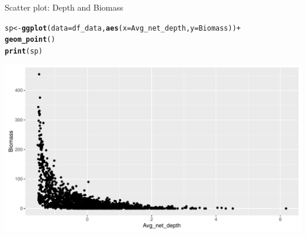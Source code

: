\documentclass{beamer}\usepackage[]{graphicx}\usepackage[]{color}
\makeatletter
\newcommand{\hlopt}[1]{\textcolor[rgb]{0,0,0}{#1}}%
\newcommand{\hlstd}[1]{\textcolor[rgb]{0.345,0.345,0.345}{#1}}%
\newcommand{\hlkwb}[1]{\textcolor[rgb]{0.69,0.353,0.396}{#1}}%
\newcommand{\hlkwc}[1]{\textcolor[rgb]{0.333,0.667,0.333}{#1}}%
\newcommand{\hlkwd}[1]{\textcolor[rgb]{0.737,0.353,0.396}{\textbf{#1}}}%
\newenvironment{kframe}{%
 \def\at@end@of@kframe{}%
 \ifinner\ifhmode%
  \def\at@end@of@kframe{\end{minipage}}%
  \begin{minipage}{\columnwidth}%
 \fi\fi%
 \def\FrameCommand##1{\hskip\@totalleftmargin \hskip-\fboxsep
 \colorbox{shadecolor}{##1}\hskip-\fboxsep
     \hskip-\linewidth \hskip-\@totalleftmargin \hskip\columnwidth}%
 \MakeFramed {\advance\hsize-\width
   \@totalleftmargin\z@ \linewidth\hsize
   \@setminipage}}%
 {\par\unskip\endMakeFramed%
 \at@end@of@kframe}
\newenvironment{knitrout}{}{} %
\makeatother
\begin{document}
\begin{frame}[fragile]{Scatter plot: Depth and Biomass}
\begin{knitrout}\footnotesize
{}\color{fgcolor}\begin{kframe}
\begin{alltt}
\hlstd{sp} \hlkwb{<-} \hlkwd{ggplot}\hlstd{(}\hlkwc{data}\hlstd{=df_data,} \hlkwd{aes}\hlstd{(}\hlkwc{x}\hlstd{=Avg_net_depth,} \hlkwc{y}\hlstd{=Biomass))} \hlopt{+}
  \hlkwd{geom_point}\hlstd{()}
\hlkwd{print}\hlstd{(sp)}
\end{alltt}
\end{kframe}

{\centering \includegraphics[width=.9\linewidth]{figure/scatter_plot_base-1} 

}



\end{knitrout}
\end{frame}
\end{document}
